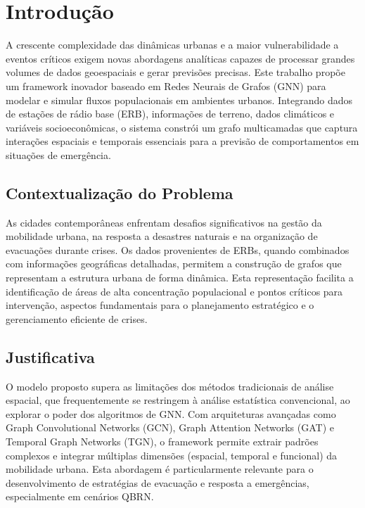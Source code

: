 \chapter{Introdução}
\label{chap:introducao}

A crescente complexidade das dinâmicas urbanas e a maior vulnerabilidade a eventos críticos exigem novas abordagens analíticas capazes de processar grandes volumes de dados geoespaciais e gerar previsões precisas. Este trabalho propõe um framework inovador baseado em Redes Neurais de Grafos (\gls{GNN}) para modelar e simular fluxos populacionais em ambientes urbanos. Integrando dados de estações de rádio base (\gls{ERB}), informações de terreno, dados climáticos e variáveis socioeconômicas, o sistema constrói um grafo multicamadas que captura interações espaciais e temporais essenciais para a previsão de comportamentos em situações de emergência.

\section{Contextualização do Problema}
As cidades contemporâneas enfrentam desafios significativos na gestão da mobilidade urbana, na resposta a desastres naturais e na organização de evacuações durante crises. Os dados provenientes de \gls{ERB}s, quando combinados com informações geográficas detalhadas, permitem a construção de grafos que representam a estrutura urbana de forma dinâmica. Esta representação facilita a identificação de áreas de alta concentração populacional e pontos críticos para intervenção, aspectos fundamentais para o planejamento estratégico e o gerenciamento eficiente de crises.

\section{Justificativa}
O modelo proposto supera as limitações dos métodos tradicionais de análise espacial, que frequentemente se restringem à análise estatística convencional, ao explorar o poder dos algoritmos de \gls{GNN}. Com arquiteturas avançadas como Graph Convolutional Networks (GCN), Graph Attention Networks (GAT) e Temporal Graph Networks (TGN), o framework permite extrair padrões complexos e integrar múltiplas dimensões (espacial, temporal e funcional) da mobilidade urbana. Esta abordagem é particularmente relevante para o desenvolvimento de estratégias de evacuação e resposta a emergências, especialmente em cenários \gls{QBRN}.

